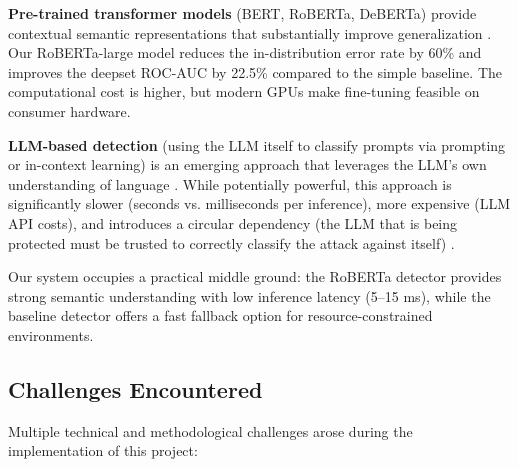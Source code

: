 \documentclass[12pt, letterpaper]{article}   %
\begin{document}
\textbf{Pre-trained transformer models} (BERT, RoBERTa, DeBERTa) provide contextual semantic representations that substantially improve generalization \cite{ref37}\cite{ref15}\cite{ref27}. Our RoBERTa-large model reduces the in-distribution error rate by 60\% and improves the deepset ROC-AUC by 22.5\% compared to the simple baseline. The computational cost is higher, but modern GPUs make fine-tuning feasible on consumer hardware.

\textbf{LLM-based detection} (using the LLM itself to classify prompts via prompting or in-context learning) is an emerging approach that leverages the LLM's own understanding of language \cite{ref10}\cite{ref8}. While potentially powerful, this approach is significantly slower (seconds vs. milliseconds per inference), more expensive (LLM API costs), and introduces a circular dependency (the LLM that is being protected must be trusted to correctly classify the attack against itself) \cite{ref4}.

Our system occupies a practical middle ground: the RoBERTa detector provides strong semantic understanding with low inference latency (5--15 ms), while the baseline detector offers a fast fallback option for resource-constrained environments.


\subsection{Challenges Encountered}

Multiple technical and methodological challenges arose during the implementation of this project:
\end{document}
